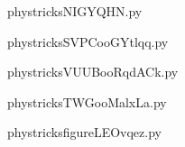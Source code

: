     

    \clearpage
    


    \newcommand{\CaptionFigNIGYQHN}{<+Type your caption here+>}
    \begin{center}
        
    \end{center}
    phystricksNIGYQHN.py

    

    \clearpage
    


    \newcommand{\CaptionFigSVPCooGYtlqq}{<+Type your caption here+>}
    \begin{center}
        
    \end{center}
    phystricksSVPCooGYtlqq.py

    

    \clearpage
    


    \newcommand{\CaptionFigVUUBooRqdACk}{<+Type your caption here+>}
    \begin{center}
        
    \end{center}
    phystricksVUUBooRqdACk.py

    

    \clearpage
    


    \newcommand{\CaptionFigTWGooMalxLa}{<+Type your caption here+>}
    \begin{center}
        
    \end{center}
    phystricksTWGooMalxLa.py

    

    \clearpage
    


    \newcommand{\CaptionFigfigureLEOvqez}{<+Type your caption here+>}
    \begin{center}
        
    \end{center}
    phystricksfigureLEOvqez.py

    

    \clearpage
    


